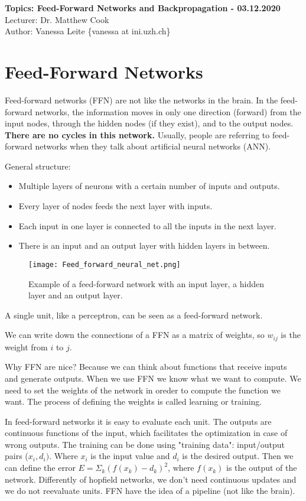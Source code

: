 \documentclass[main]{subfiles}
\begin{document}
\noindent
\textbf{Topics: Feed-Forward Networks and Backpropagation - 03.12.2020} \\
Lecturer: Dr. Matthew Cook \\
Author: Vanessa Leite \{vanessa at ini.uzh.ch\}

\section{Feed-Forward Networks}

Feed-forward networks (FFN) are not like the networks in the brain.
In the feed-forward networks, the information moves in only one direction (forward) from the input nodes, through the hidden nodes (if they exist), and to the output nodes.
\textbf{There are no cycles in this network.}
Usually, people are referring to feed-forward networks when they talk about artificial neural networks (ANN).

General structure:
\begin{itemize}[noitemsep,nolistsep]
	\item Multiple layers of neurons with a certain number of inputs and outputs.
	\item Every layer of nodes feeds the next layer with inputs.
	\item Each input in one layer is connected to all the inputs in the next layer.
	\item There is an input and an output layer with hidden layers in between.
\end{itemize}

\begin{figure}[H]
	\centering
	\texttt{[image: Feed\_forward\_neural\_net.png]}
	\caption{Example of a feed-forward network with an input layer, a hidden layer and an output layer.}
\end{figure}

A single unit, like a perceptron, can be seen as a feed-forward network.

We can write down the connections of a FFN as a matrix of weights, so $w_{ij}$ is the weight from $i$ to $j$.

Why FFN are nice?
Because we can think about functions that receive inputs and generate outputs.
When we use FFN we know what we want to compute.
We need to set the weights of the network in oreder to compute the function we want.
The process of defining the weights is called learning or training.

In feed-forward networks it is easy to evaluate each unit.
The outputs are continuous functions of the input, which facilitates the optimization in case of wrong outputs.
The training can be done using "training data": input/output pairs ($x_i, d_i)$. Where $x_i$ is the input value and $d_i$ is the desired output.
Then we can define the error $E = \Sigma_k (f(x_k) - d_k)^2$, where $f(x_k)$ is the output of the network.
Differently of hopfield networks, we don't need continuous updates and we do not reevaluate units.
FFN have the idea of a pipeline (not like the brain).
\end{document}
